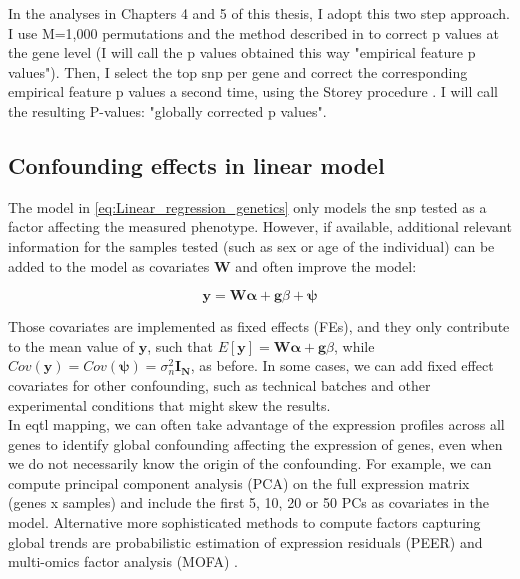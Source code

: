 In the analyses in Chapters 4 and 5 of this thesis, I adopt this two step approach.
I use M=1,000 permutations and the method described in \cite{ongen2016fast} to correct p values at the gene level (I will call the p values obtained this way "empirical feature p values").
Then, I select the top \gls{snp} per gene and correct the corresponding empirical feature p values a second time, using the Storey procedure \cite{storey2002direct}.
I will call the resulting P-values: "globally corrected p values".

\subsection{Confounding effects in linear model}

The model in \eqref{eq:Linear_regression_genetics} only models the \gls{snp} tested as a factor affecting the measured phenotype.
However, if available, additional relevant information for the samples tested (such as sex or age of the individual) can be added to the model as covariates $\mathbf{W}$ and often improve the model:

\begin{equation}\label{eq:Linear_regression_genetics_covariates}
 \mathbf{y} =  \mathbf{W}\boldsymbol{\alpha} + \mathbf{g}\beta + \boldsymbol{\psi} 
\end{equation}

Those covariates are implemented as fixed effects (FEs), and they only contribute to the mean value of $\mathbf{y}$, such that $E[\mathbf{y}] = \mathbf{W}\boldsymbol{\alpha} + \mathbf{g}\beta$, while $Cov(\mathbf{y}) = Cov(\boldsymbol{\psi}) = \sigma_n^2 \mathbf{I_N} $, as before.
In some cases, we can add fixed effect covariates for other confounding, such as technical batches and other experimental conditions that might skew the results. \\

In e\gls{qtl} mapping, we can often take advantage of the expression profiles across all genes to identify global confounding affecting the expression of genes, even when we do not necessarily know the origin of the confounding.
For example, we can compute principal component analysis (PCA) on the full expression matrix (genes x samples) and include the first 5, 10, 20 or 50 PCs as covariates in the model.
Alternative more sophisticated methods to compute factors capturing global trends are probabilistic estimation of expression residuals (PEER) \cite{stegle2010bayesian, stegle2012using} and multi-omics factor analysis (MOFA) \cite{argelaguet2018multi}. 

